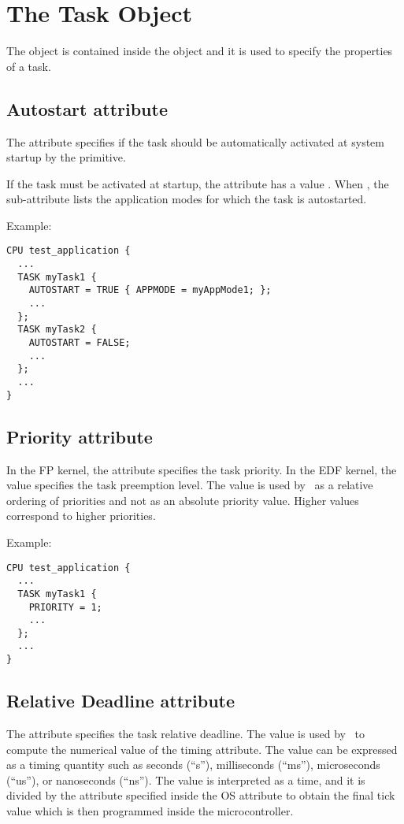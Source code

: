 \section{The Task Object}

The  object is contained inside the  object and it is used to specify the properties of a task.

\subsection{Autostart attribute}
The  attribute specifies if the task should be
automatically activated at system startup by the 
primitive.

If the task must be activated at startup, the 
attribute has a value . When , the
 sub-attribute lists the application modes for which
the task is autostarted.

Example:

\begin{lstlisting}
CPU test_application {
  ...
  TASK myTask1 {
    AUTOSTART = TRUE { APPMODE = myAppMode1; };
    ...
  };
  TASK myTask2 {
    AUTOSTART = FALSE;
    ...
  };
  ...
}
\end{lstlisting}

\subsection{Priority attribute}
In the FP kernel, the  attribute specifies the task
priority. In the EDF kernel, the value specifies the task preemption
level. The value is used by \rtd\ as a relative ordering of priorities
and not as an absolute priority value. Higher values correspond to
higher priorities.

Example:

\begin{lstlisting}
CPU test_application {
  ...
  TASK myTask1 {
    PRIORITY = 1;
    ...
  };
  ...
}
\end{lstlisting}

\subsection{Relative Deadline attribute}
The  attribute specifies the task relative deadline. The
value is used by \rtd\ to compute the numerical value of the timing
attribute. The value can be expressed as a timing quantity such as
seconds (``s''), milliseconds (``ms''), microseconds (``us''), or
nanoseconds (``ns''). The value is interpreted as a time, and it is
divided by the  attribute specified inside the OS
attribute  to obtain the final tick value which is
then programmed inside the microcontroller.

